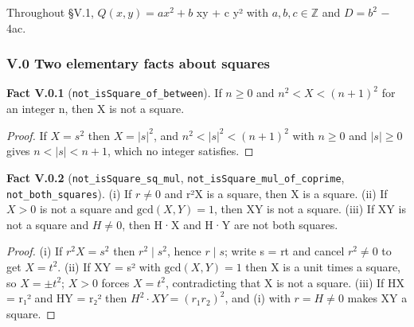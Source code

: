\documentclass[11pt]{article}
\theoremstyle{plain}
\theoremstyle{definition}
\theoremstyle{remark}
\theoremstyle{plain}
\theoremstyle{definition}
\theoremstyle{remark}
\theoremstyle{plain}
\theoremstyle{definition}
\theoremstyle{remark}
\begin{document}
Throughout §V.1, $Q(x,y) = a x^{2} + b$ xy + c y² with $a, b, c ∈ ℤ$ and $D = b^{2}$ − 4ac.

\subsubsection*{V.0 Two elementary facts about squares}
\textbf{Fact V.0.1} (\texttt{not\_\allowbreak{}isSquare\_\allowbreak{}of\_\allowbreak{}between}). If $n ≥ 0$ and $n^{2} < X < (n+1)^{2}$ for an integer n, then X is not a square.

\begin{proof}
If $X = s^{2}$ then $X = |s|^{2}$, and $n^{2} < |s|^{2} < (n+1)^{2}$ with $n ≥ 0$ and $|s| ≥ 0$ gives $n < |s| < n+1$, which no integer satisfies.

\end{proof}
\textbf{Fact V.0.2} (\texttt{not\_\allowbreak{}isSquare\_\allowbreak{}sq\_\allowbreak{}mul}, \texttt{not\_\allowbreak{}isSquare\_\allowbreak{}mul\_\allowbreak{}of\_\allowbreak{}coprime}, \texttt{not\_\allowbreak{}both\_\allowbreak{}squares}). (i) If $r ≠ 0$ and r²X is a square, then X is a square. (ii) If $X > 0$ is not a square and $\mathrm{gcd}(X, Y) = 1$, then XY is not a square. (iii) If XY is not a square and $H ≠ 0$, then H·X and H·Y are not both squares.

\begin{proof}
(i) If $r^{2}X = s^{2}$ then $r^{2} ∣ s^{2}$, hence $r ∣ s$; write s = rt and cancel $r^{2} ≠ 0$ to get $X = t^{2}$. (ii) If XY = s² with $\mathrm{gcd}(X,Y) = 1$ then X is a unit times a square, so $X = ±t^{2}$; $X > 0$ forces $X = t^{2}$, contradicting that X is not a square. (iii) If HX = r₁² and HY = r₂² then $H^{2}·XY = (r_{1}r_{2})^{2}$, and (i) with $r = H ≠ 0$ makes XY a square.

\end{proof}
\end{document}
